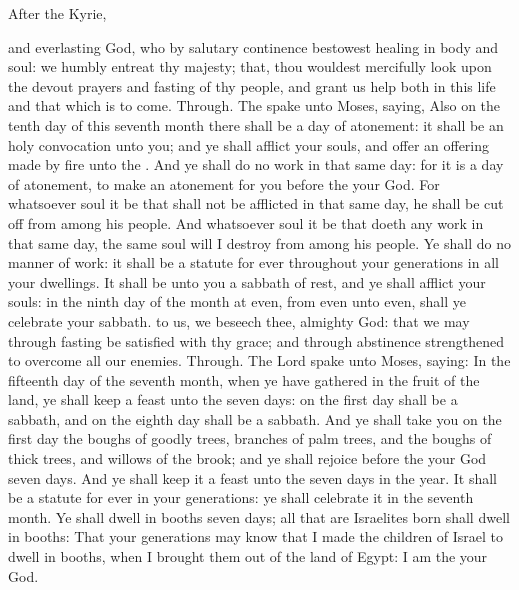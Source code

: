 \begin{rubric}
    After the Kyrie,
\end{rubric}
\collect
{} and everlasting God, who by salutary continence bestowest healing in body and soul: we humbly entreat thy majesty; that, thou wouldest mercifully look upon the devout prayers and fasting of thy people, and grant us help both in this life and that which is to come. Through.
 The  spake unto Moses, saying, Also on the tenth day of this seventh month there shall be a day of atonement: it shall be an holy convocation unto you; and ye shall afflict your souls, and offer an offering made by fire unto the . And ye shall do no work in that same day: for it is a day of atonement, to make an atonement for you before the  your God. For whatsoever soul it be that shall not be afflicted in that same day, he shall be cut off from among his people. And whatsoever soul it be that doeth any work in that same day, the same soul will I destroy from among his people. Ye shall do no manner of work: it shall be a statute for ever throughout your generations in all your dwellings. It shall be unto you a sabbath of rest, and ye shall afflict your souls: in the ninth day of the month at even, from even unto even, shall ye celebrate your sabbath.
\collect
{} to us, we beseech thee, almighty God: that we may through fasting be satisfied with thy grace; and through abstinence strengthened to overcome all our enemies. Through.
 The Lord spake unto Moses, saying: In the fifteenth day of the seventh month, when ye have gathered in the fruit of the land, ye shall keep a feast unto the  seven days: on the first day shall be a sabbath, and on the eighth day shall be a sabbath. And ye shall take you on the first day the boughs of goodly trees, branches of palm trees, and the boughs of thick trees, and willows of the brook; and ye shall rejoice before the  your God seven days. And ye shall keep it a feast unto the  seven days in the year. It shall be a statute for ever in your generations: ye shall celebrate it in the seventh month. Ye shall dwell in booths seven days; all that are Israelites born shall dwell in booths: That your generations may know that I made the children of Israel to dwell in booths, when I brought them out of the land of Egypt: I am the  your God.
